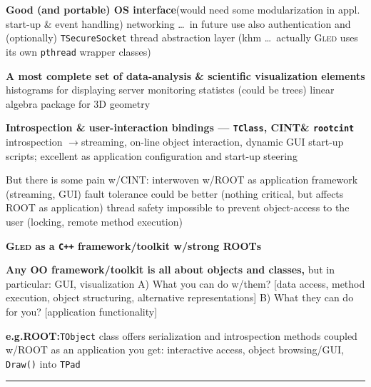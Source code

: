 \documentclass[12pt]{article}
\def\nl{\newline}
\def\bl{\bigskip\hrule\bigskip}
\def\q{\quad}
\def\qq{\quad\quad}
\def\gled{\textsc{Gled}\xspace}
\def\root{\textsc{ROOT}\xspace}
\def\cint{\textsc{CINT}\xspace}
\def\rootcint{\texttt{rootcint}\xspace}
\def\eg{e.g.\xspace}
\begin{document}
\bigskip
\textbf{Good (and portable) OS interface}\qq (would need some
modularization in appl. start-up \& event handling)\nl
networking \dots\ in future use also authentication and (optionally)
\texttt{TSecureSocket}\nl
thread abstraction layer (khm \dots\ actually \gled uses its own
\texttt{pthread} wrapper classes)

\bigskip
\textbf{A most complete set of data-analysis \& scientific
  visualization elements}\nl
histograms for displaying server monitoring statistcs (could be
trees)\nl
linear algebra package for 3D geometry

\bigskip
\textbf{Introspection \& user-interaction bindings ---
  \texttt{TClass}, \cint \&
  \rootcint}\nl
introspection \q$\to$\q streaming, on-line object interaction, dynamic
GUI\nl
start-up scripts; excellent as application configuration and start-up steering

But there is some pain w/\cint:\nl
interwoven w/\root as application framework (streaming, GUI)\nl
fault tolerance could be better (nothing critical, but affects \root
as application)\nl
thread safety\nl
impossible to prevent object-access to the user (locking, remote
method execution)

\newpage

\textbf{\LARGE \gled as a \texttt{C++} framework/toolkit w/strong {\root}s} 

\bigskip
\textbf{Any OO framework/toolkit is all about objects and classes,}
but in particular:
\hfill{{\color{dgreen} \large GUI, visualization}\qq}
\nl
%
A) What you can do w/them? [data access, method execution, object
structuring, alternative representations]\nl
%
B) What they can do for you? [application functionality]

\bigskip
\textbf{\eg \root:}\qq \texttt{TObject} class offers serialization and introspection
methods\nl
coupled w/\root as an application you get: interactive access, object
browsing/GUI, \texttt{Draw()} into \texttt{TPad}

\bl
\end{document}
